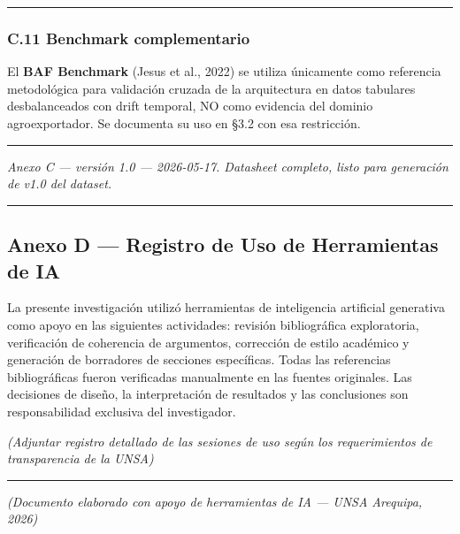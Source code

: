 \begin{center}\rule{0.5\linewidth}{0.5pt}\end{center}

\subsubsection{C.11 Benchmark
complementario}\label{c.11-benchmark-complementario}

El \textbf{BAF Benchmark} (Jesus et al., 2022) se utiliza únicamente
como referencia metodológica para validación cruzada de la arquitectura
en datos tabulares desbalanceados con drift temporal, NO como evidencia
del dominio agroexportador. Se documenta su uso en §3.2 con esa
restricción.

\begin{center}\rule{0.5\linewidth}{0.5pt}\end{center}

\emph{Anexo C --- versión 1.0 --- 2026-05-17. Datasheet completo, listo
para generación de v1.0 del dataset.}

\begin{center}\rule{0.5\linewidth}{0.5pt}\end{center}

\subsection{Anexo D --- Registro de Uso de Herramientas de
IA}\label{anexo-d-registro-de-uso-de-herramientas-de-ia}

La presente investigación utilizó herramientas de inteligencia
artificial generativa como apoyo en las siguientes actividades: revisión
bibliográfica exploratoria, verificación de coherencia de argumentos,
corrección de estilo académico y generación de borradores de secciones
específicas. Todas las referencias bibliográficas fueron verificadas
manualmente en las fuentes originales. Las decisiones de diseño, la
interpretación de resultados y las conclusiones son responsabilidad
exclusiva del investigador.

\emph{(Adjuntar registro detallado de las sesiones de uso según los
requerimientos de transparencia de la UNSA)}

\begin{center}\rule{0.5\linewidth}{0.5pt}\end{center}

\emph{(Documento elaborado con apoyo de herramientas de IA --- UNSA
Arequipa, 2026)}
